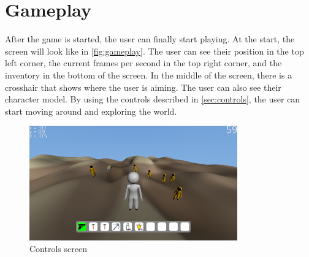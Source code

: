 \section{Gameplay}\label{sec:gameplay}
After the game is started, the user can finally start playing.
At the start, the screen will look like in \autoref{fig:gameplay}.
The user can see their position in the top left corner, the current frames per second in the top right corner, and the inventory in the bottom of the screen.
In the middle of the screen, there is a crosshair that shows where the user is aiming.
The user can also see their character model.
By using the controls described in \autoref{sec:controls}, the user can start moving around and exploring the world.


\begin{figure}[h]
    \centering
    \includegraphics[width=0.8\textwidth]{chapters/user_manual/resources/gameplay.png}
    \caption{Controls screen}
    \label{fig:gameplay}
\end{figure}